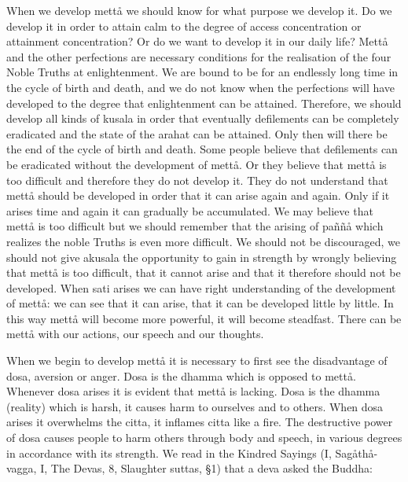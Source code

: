 \documentclass[12pt,twoside]{article}
\begin{document}
When we develop mett{\aa} we should know for what purpose we develop it.
Do we develop it in order to attain calm to the degree of access
concentration or attainment concentration? Or do we want to develop it
in our daily life? Mett{\aa} and the other
{\textasciigrave}{\textasciigrave}perfections{\textquotesingle}{\textquotesingle}
are necessary conditions for the realisation of the four Noble Truths
at enlightenment. We are bound to be for an endlessly long time in the
cycle of birth and death, and we do not know when the perfections will
have developed to the degree that enlightenment can be attained.
Therefore, we should develop all kinds of kusala in order that
eventually defilements can be completely eradicated and the state of
the arahat can be attained. Only then will there be the end of the
cycle of birth and death. Some people believe that defilements can be
eradicated without the development of mett{\aa}. Or they believe that
mett{\aa} is too difficult and therefore they do not develop it. They
do not understand that mett{\aa} should be developed in order that it
can arise again and again. Only if it arises time and again it can
gradually be accumulated. We may believe that mett{\aa} is too
difficult but we should remember that the arising of pa\~n\~n{\aa}
which realizes the noble Truths is even more difficult. We should not
be discouraged, we should not give akusala the opportunity to gain in
strength by wrongly believing that mett{\aa} is too difficult, that it
cannot arise and that it therefore should not be developed. When sati
arises we can have right understanding of the development of mett{\aa}:
we can see that it can arise, that it can be developed little by
little. In this way mett{\aa} will become more powerful, it will become
steadfast. There can be mett{\aa} with our actions, our speech and our
thoughts. 

When we begin to develop mett{\aa} it is necessary to first see the
disadvantage of dosa, aversion or anger. Dosa is the dhamma which is
opposed to mett{\aa}. Whenever dosa arises it is evident that mett{\aa}
is lacking. Dosa is the dhamma (reality) which is harsh, it causes harm
to ourselves and to others. When dosa arises it overwhelms the citta,
it inflames citta like a fire. The destructive power of dosa causes
people to harm others through body and speech, in various degrees in
accordance with its strength. We read in the Kindred Sayings (I,
Sag{\aa}th{\aa}{}-vagga, I, The Devas, 8, Slaughter suttas, {\S}1) that
a deva asked the Buddha:


\bigskip
\end{document}
